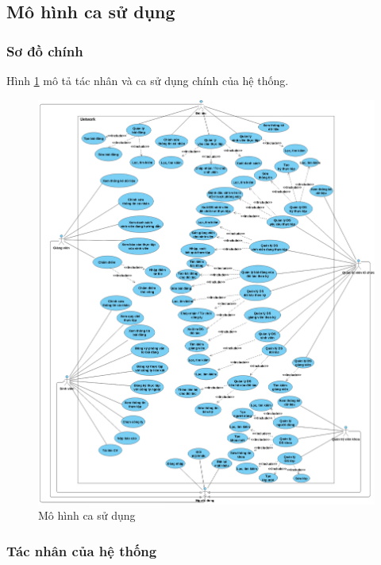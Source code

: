 \documentclass[./../main.tex]{subfiles}
\begin{document}
\subsection{Mô hình ca sử dụng}

\subsubsection{Sơ đồ chính}

Hình \ref{fig:use_case_diagram} mô tả tác nhân và ca sử dụng chính của hệ thống.

\begin{figure}[h!]
	\includegraphics[width=\linewidth]{./images/image4.png}
	\caption{Mô hình ca sử dụng}
	\label{fig:use_case_diagram}
\end{figure}

\subsubsection{Tác nhân của hệ thống}
\end{document}
